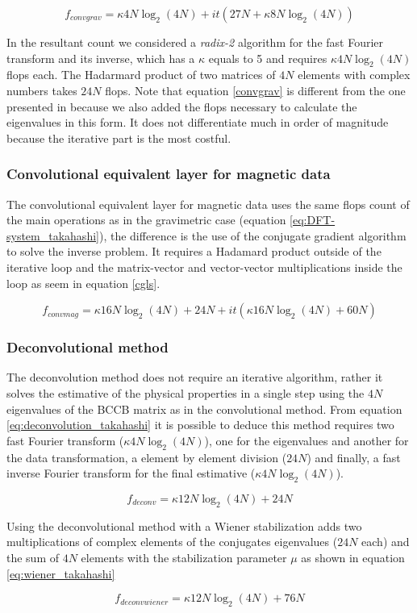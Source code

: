 \begin{equation}
	f_{convgrav} = \kappa4N\log_2(4N) + it(27N + \kappa8N\log_2(4N))
\label{convgrav}
\end{equation}

In the resultant count we considered a \textit{radix-2} algorithm for the fast Fourier transform and its inverse, which has a $\kappa$ equals to 5 and requires $\kappa4N\log_2(4N)$ flops each. The Hadarmard product of two matrices of $4N$ elements with complex numbers takes $24N$ flops. Note that equation \ref{convgrav} is different from the one presented in \cite{takahashi2020} because we also added the flops necessary to calculate the  eigenvalues in this form. It does not differentiate much in order of magnitude because the iterative part is the most costful.

\subsubsection{Convolutional equivalent layer for magnetic data \citep{takahashi2022}}

The convolutional equivalent layer for magnetic data uses the same flops count of the main operations as in the gravimetric case (equation \ref{eq:DFT-system_takahashi}), the difference is the use of the conjugate gradient algorithm to solve the inverse problem.
It requires a Hadamard product outside of the iterative loop and the matrix-vector and vector-vector multiplications inside the loop as seem in equation \ref{cgls}.

\begin{equation}
	f_{convmag} = \kappa16N\log_2(4N) + 24N + it(\kappa16N\log_2(4N) + 60N)
\label{convmag}
\end{equation}

\subsubsection{Deconvolutional method}

The deconvolution method does not require an iterative algorithm, rather it solves the estimative of the physical properties in a single step using the $4N$ eigenvalues of the BCCB matrix as in the convolutional method. From equation \ref{eq:deconvolution_takahashi} it is possible to deduce this method requires two fast Fourier transform ($\kappa4N\log_2(4N)$), one for the eigenvalues and another for the data transformation, a element by element division ($24N$) and finally, a fast inverse Fourier transform for the final estimative ($\kappa4N\log_2(4N)$).

\begin{equation}
	f_{deconv} = \kappa12N\log_2(4N) + 24N
	\label{deconv}
\end{equation}

Using the deconvolutional method with a Wiener stabilization adds two multiplications of complex elements of the conjugates eigenvalues ($24N$ each) and the sum of $4N$ elements with the stabilization parameter $\mu$ as shown in equation \ref{eq:wiener_takahashi}

\begin{equation}
	f_{deconvwiener} = \kappa12N\log_2(4N) + 76N
	\label{deconvwiener}
\end{equation}
